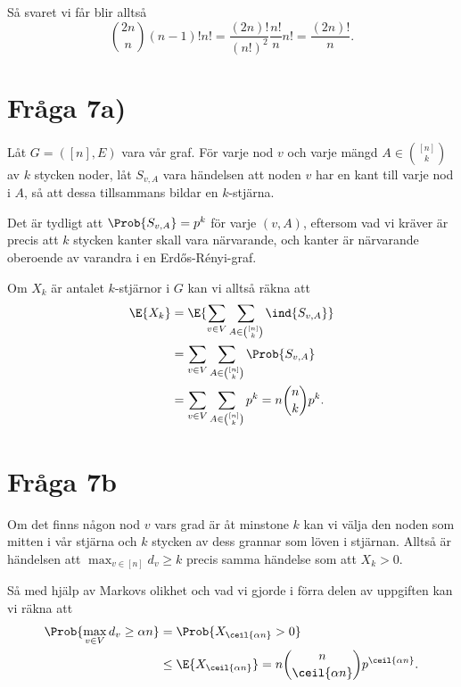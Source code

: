 \documentclass[nobib]{tufte-handout}
\begin{document}
Så svaret vi får blir alltså
$$\binom{2n}{n}(n-1)!n! = \frac{(2n)!}{(n!)^2}\frac{n!}{n}n! = \frac{(2n)!}{n}.$$

\section{Fråga 7a)}

Låt $G = ([n], E)$ vara vår graf. För varje nod $v$ och varje mängd $A \in \binom{[n]}{k}$ av $k$ stycken noder, låt $S_{v, A}$ vara händelsen att noden $v$ har en kant till varje nod i $A$, så att dessa tillsammans bildar en $k$-stjärna.

Det är tydligt att $\Prob{S_{v,A}} = p^k$ för varje $(v, A)$, eftersom vad vi kräver är precis att $k$ stycken kanter skall vara närvarande, och kanter är närvarande oberoende av varandra i en Erd\H{o}s-Rényi-graf.

Om $X_k$ är antalet $k$-stjärnor i $G$ kan vi alltså räkna att
\begin{align*}
    \E{X_k} &= \E{\sum_{v \in V}\sum_{A \in \binom{[n]}{k}} \ind{S_{v,A}}}\\
    &= \sum_{v \in V}\sum_{A \in \binom{[n]}{k}} \Prob{S_{v,A}}\\
    &= \sum_{v \in V}\sum_{A \in \binom{[n]}{k}} p^k = n\binom{n}{k}p^k.
\end{align*}

\section{Fråga 7b}

Om det finns någon nod $v$ vars grad är åt minstone $k$ kan vi välja den noden som mitten i vår stjärna och $k$ stycken av dess grannar som löven i stjärnan. Alltså är händelsen att $\max_{v \in [n]} d_v \geq k$ precis samma händelse som att $X_k > 0$.

Så med hjälp av Markovs olikhet och vad vi gjorde i förra delen av uppgiften kan vi räkna att
\begin{align*}
    \Prob{\max_{v \in V} d_v \geq \alpha n} &= \Prob{X_{\ceil{\alpha n}} > 0}\\
    &\leq \E{X_{\ceil{\alpha n}}} = n\binom{n}{\ceil{\alpha n}}p^{\ceil{\alpha n}}.
\end{align*}
\end{document}
